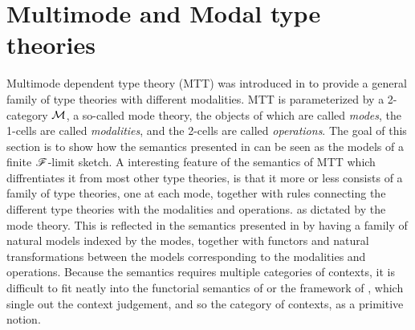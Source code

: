 \documentclass[../thesis.tex]{subfiles}
\begin{document}
\section{Multimode and Modal type theories}
Multimode dependent type theory (MTT) was introduced in \cite{gratzer2021} to provide a general family of type theories
with different modalities. MTT is parameterized by a 2-category ${\mathcal{M}}$, a so-called mode theory, the objects of which
are called \emph{modes}, the 1-cells are called \emph{modalities}, and the 2-cells are called \emph{operations}.
The goal of this section is to show how the semantics presented in \cite{gratzer2021} can be seen as the models of
a finite ${\mathscr{F}}$-limit sketch. A interesting feature of the semantics of MTT which diffrentiates it from most other
type theories, is that it more or less consists of a family of type theories, one at each mode, together with rules
connecting the different type theories with the modalities and operations. as dictated by the mode theory. This is
reflected in the semantics presented in \cite{gratzer2021} by having a family of natural models indexed by the modes,
together with functors and natural transformations between the models corresponding to the modalities and operations.
Because the semantics requires multiple categories of contexts, it is difficult to fit neatly into the functorial
semantics of \cite{uemura2023} or the framework of \cite{coraglia2024a}, which single out the context judgement, and
so the category of contexts, as a primitive notion.
\end{document}
